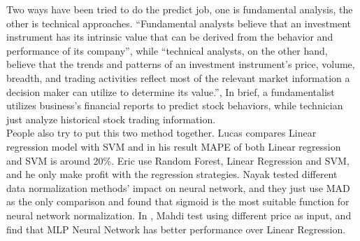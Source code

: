 Two ways have been tried to do the predict job, one is fundamental analysis, the other is technical approaches\cite{1_edwardsmagee_1997}. “Fundamental analysts believe that an investment instrument has its intrinsic value that can be derived from the behavior and performance of its company”, while “technical analysts, on the other hand, believe that the trends and patterns of an investment instrument’s price, volume, breadth, and trading activities reflect most of the relevant market information a decision maker can utilize to determine its value.”\cite{lam2004neural}, In brief, a fundamentalist utilizes business’s financial reports to predict stock behaviors, while technician just analyze historical stock trading information.\\

People also try to put this two method together. Lucas\cite{nunnostock} compares Linear regression model with SVM and in his result MAPE of both Linear regression and SVM is around 20\%. Eric\cite{alexanderstock} use Random Forest, Linear Regression and SVM, and he only make profit with the regression strategies. Nayak\cite{nayak2014impact} tested different data normalization methods’ impact on neural network, and they just use MAD as the only comparison and found that sigmoid is the most suitable function for neural network normalization. In \cite{naeini2010stock}, Mahdi test using different price as input, and find that MLP Neural Network has better performance over Linear Regression.
